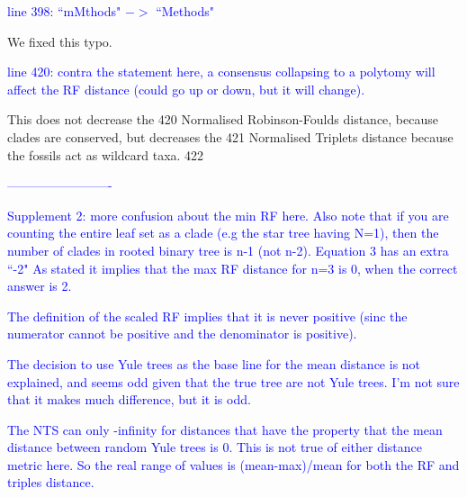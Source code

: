 \documentclass[11pt]{letter}
\begin{document}
\begin{letter}{}

\textcolor{blue}{line 398: ``mMthods" $->$ ``Methods"}

We fixed this typo.

\textcolor{blue}{line 420: contra the statement here, a consensus collapsing to a polytomy will affect the RF distance (could go up or down, but it will change).}


This does not decrease the 420
Normalised Robinson-Foulds distance, because clades are conserved, but decreases the 421
Normalised Triplets distance because the fossils act as wildcard taxa. 422




\textcolor{blue}{-------------------------}

\textcolor{blue}{Supplement 2:}
\textcolor{blue}{more confusion about the min RF here. Also note that if you are counting the entire leaf set as a clade (e.g the star tree having N=1), then the number of clades in rooted binary tree is n-1 (not n-2). Equation 3 has an extra ``-2" As stated it implies that the max RF distance for n=3 is 0, when the correct answer is 2.}



\textcolor{blue}{The definition of the scaled RF implies that it is never positive (sinc the numerator cannot be positive and the denominator is positive).}



\textcolor{blue}{The decision to use Yule trees as the base line for the mean distance is not explained, and seems odd given that the true tree are not Yule trees. I'm not sure that it makes much difference, but it is odd.}



\textcolor{blue}{The NTS can only -infinity for distances that have the property that the mean distance between random Yule trees is 0. This is not true of either distance metric here. So the real range of values is (mean-max)/mean for both the RF and triples distance.}




\end{letter}
\end{document}
